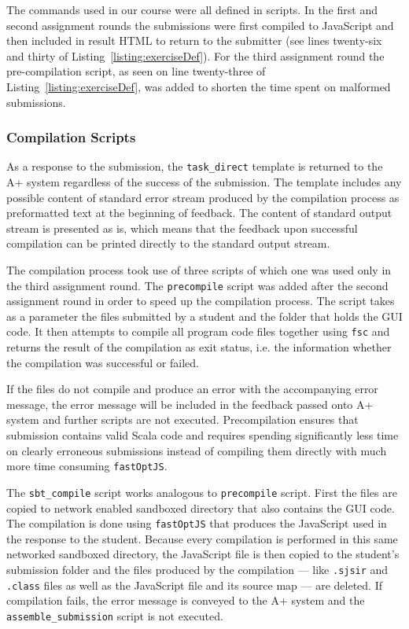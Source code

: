 The commands used in our course were all defined in scripts. In the first and second assignment rounds the submissions were first compiled to JavaScript and then included in result HTML to return to the submitter (see lines twenty-six and thirty of Listing~\ref{listing:exerciseDef}). For the third assignment round the pre-compilation script, as seen on line twenty-three of Listing~\ref{listing:exerciseDef}, was added to shorten the time spent on malformed submissions.


\subsubsection*{Compilation Scripts}

As a response to the submission, the \texttt{task\_direct} template is returned to the A+ system regardless of the success of the submission. The template includes any possible content of standard error stream produced by the compilation process as preformatted text at the beginning of feedback. The content of standard output stream is presented as is, which means that the feedback upon successful compilation can be printed directly to the standard output stream.

The compilation process took use of three scripts of which one was used only in the third assignment round. The \texttt{precompile} script was added after the second assignment round in order to speed up the compilation process. The script takes as a parameter the files submitted by a student and the folder that holds the GUI code. It then attempts to compile all program code files together using \texttt{fsc} and returns the result of the compilation as exit status, i.e. the information whether the compilation was successful or failed.

If the files do not compile and produce an error with the accompanying error message, the error message will be included in the feedback passed onto A+ system and further scripts are not executed. Precompilation ensures that submission contains valid Scala code and requires spending significantly less time on clearly erroneous submissions instead of compiling them directly with much more time consuming \texttt{fastOptJS}.

The \texttt{sbt\_compile} script works analogous to \texttt{precompile} script. First the files are copied to network enabled sandboxed directory that also contains the GUI code. The compilation is done using \texttt{fastOptJS} that produces the JavaScript used in the response to the student. Because every compilation is performed in this same networked sandboxed directory, the JavaScript file is then copied to the student's submission folder and the files produced by the compilation --- like \texttt{.sjsir} and \texttt{.class} files as well as the JavaScript file and its source map --- are deleted. If compilation fails, the error message is conveyed to the A+ system and the \texttt{assemble\_submission} script is not executed.

